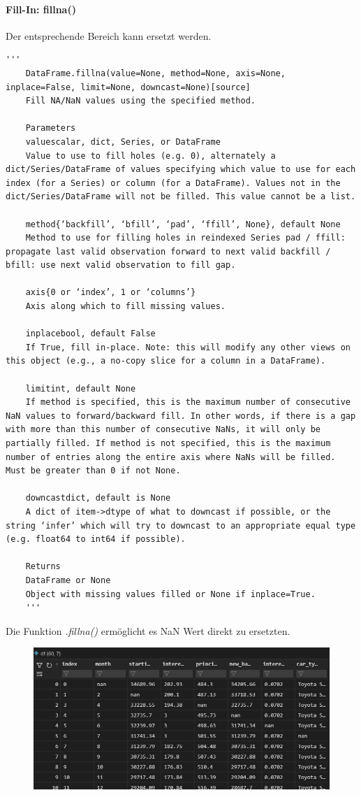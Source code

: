 \paragraph{Fill-In: fillna()} Der entsprechende Bereich kann ersetzt werden.
\begin{lstlisting}[style=Python]
	'''
	DataFrame.fillna(value=None, method=None, axis=None, inplace=False, limit=None, downcast=None)[source]
	Fill NA/NaN values using the specified method.
	
	Parameters
	valuescalar, dict, Series, or DataFrame
	Value to use to fill holes (e.g. 0), alternately a dict/Series/DataFrame of values specifying which value to use for each index (for a Series) or column (for a DataFrame). Values not in the dict/Series/DataFrame will not be filled. This value cannot be a list.
	
	method{‘backfill’, ‘bfill’, ‘pad’, ‘ffill’, None}, default None
	Method to use for filling holes in reindexed Series pad / ffill: propagate last valid observation forward to next valid backfill / bfill: use next valid observation to fill gap.
	
	axis{0 or ‘index’, 1 or ‘columns’}
	Axis along which to fill missing values.
	
	inplacebool, default False
	If True, fill in-place. Note: this will modify any other views on this object (e.g., a no-copy slice for a column in a DataFrame).
	
	limitint, default None
	If method is specified, this is the maximum number of consecutive NaN values to forward/backward fill. In other words, if there is a gap with more than this number of consecutive NaNs, it will only be partially filled. If method is not specified, this is the maximum number of entries along the entire axis where NaNs will be filled. Must be greater than 0 if not None.
	
	downcastdict, default is None
	A dict of item->dtype of what to downcast if possible, or the string ‘infer’ which will try to downcast to an appropriate equal type (e.g. float64 to int64 if possible).
	
	Returns
	DataFrame or None
	Object with missing values filled or None if inplace=True.
	'''
\end{lstlisting}
Die Funktion \textit{.fillna()} ermöglicht es \gls{NaN} Wert direkt zu ersetzten.
\begin{figure}[H]
	\centering
	\includegraphics[scale = 0.8]{attachment/chapter_4/Scc012}
\end{figure}
